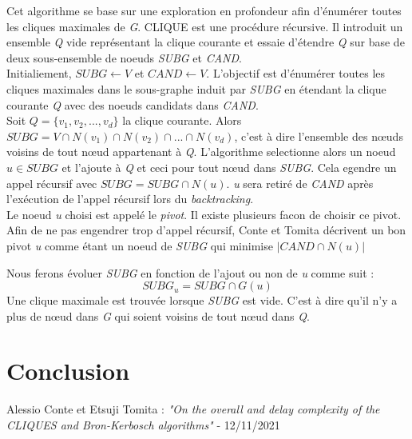 \documentclass[a4paper, 12pt]{article}
\begin{document}
Cet algorithme se base sur une exploration en profondeur afin d'énumérer toutes les cliques maximales de \emph{G}.
CLIQUE est une procédure récursive. Il introduit un ensemble \emph{Q} vide représentant la clique courante et essaie d'étendre \emph{Q} sur base de deux sous-ensemble de noeuds \textit{SUBG} et \textit{CAND}.\\

Initialiement, $ SUBG \leftarrow V $ et $ CAND \leftarrow V $. L'objectif est d'énumérer toutes les cliques maximales dans le sous-graphe induit par \emph{SUBG} en étendant la clique courante \emph{Q} avec des noeuds candidats dans \emph{CAND}. \\

Soit $ Q = \{v_1, v_2, ..., v_d\} $ la clique courante.
Alors $ SUBG = V \cap N(v_1) \cap N(v_2) \cap ... \cap N(v_d)$, c'est à dire l'ensemble des nœuds voisins de tout nœud appartenant à \emph{Q}. L'algorithme selectionne alors  un noeud $ u \in SUBG $ et l'ajoute à \emph{Q} et ceci pour tout nœud dans \emph{SUBG}. Cela egendre un appel récursif avec $ SUBG = SUBG \cap N(u) $. \emph{u} sera retiré de \emph{CAND} après l'exécution de l'appel récursif lors du \textit{backtracking}. \\

Le noeud \emph{u} choisi est appelé le \textit{pivot}. Il existe plusieurs facon de choisir ce pivot. Afin de ne pas engendrer trop d'appel récursif, Conte et Tomita\cite{contetomita} décrivent un bon pivot \emph{u} comme étant un noeud de \emph{SUBG} qui minimise $ | CAND \cap N(u) |$



Nous ferons évoluer \emph{SUBG} en fonction de l'ajout ou non de \emph{u} comme suit : $$ SUBG_u = SUBG \cap G(u) $$ Une clique maximale est trouvée lorsque \emph{SUBG} est vide. C'est à dire qu'il n'y a plus de nœud dans \emph{G} qui soient voisins de tout nœud dans \emph{Q}. \\


\section{Conclusion}


\newpage
\begin{thebibliography}{unsrt}
 Alessio Conte et Etsuji Tomita :  \textit{"On the overall and delay complexity of the CLIQUES and Bron-Kerbosch algorithms"} -  12/11/2021
\end{thebibliography}
\end{document}
